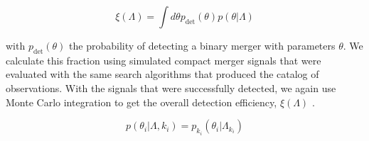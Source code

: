 \begin{equation} \label{eq:detfrac}
    \xi(\Lambda) = \int d\theta p_\mathrm{det}(\theta) p(\theta | \Lambda)
\end{equation}

\noindent with $p_\mathrm{det}(\theta)$ the probability of detecting a binary merger with parameters $\theta$. We calculate this fraction using simulated compact merger signals that were evaluated with the same search algorithms that produced the catalog of observations. With the signals that were successfully detected, we again use Monte Carlo integration to get the overall detection efficiency, $\xi(\Lambda)$ \citep{1712.00482, 1904.10879, 2204.00461}.





\begin{equation} \label{eq:latent}
    p(\theta_i | \Lambda, k_i) = p_{k_i}(\theta_i | \Lambda_{k_i})
\end{equation}

